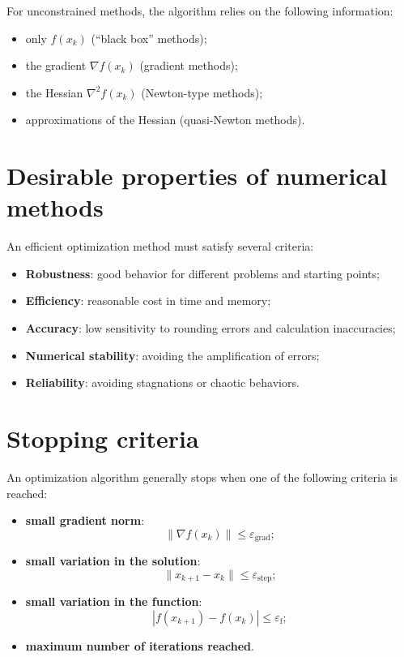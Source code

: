 For unconstrained methods, the algorithm relies on the following information:

\begin{itemize}
  \item only $f(x_k)$ (``black box'' methods);
  \item the gradient $\nabla f(x_k)$ (gradient methods);
  \item the Hessian $\nabla^2 f(x_k)$ (Newton-type methods);
  \item approximations of the Hessian (quasi-Newton methods).
\end{itemize}

\section{Desirable properties of numerical methods}

An efficient optimization method must satisfy several criteria:

\begin{itemize}
  \item \textbf{Robustness}: good behavior for different problems and starting points;
  \item \textbf{Efficiency}: reasonable cost in time and memory;
  \item \textbf{Accuracy}: low sensitivity to rounding errors and calculation inaccuracies;
  \item \textbf{Numerical stability}: avoiding the amplification of errors;
  \item \textbf{Reliability}: avoiding stagnations or chaotic behaviors.
\end{itemize}

\section{Stopping criteria}

An optimization algorithm generally stops when one of the following criteria is reached:

\begin{itemize}
  \item \textbf{small gradient norm}:
        \[
        \|\nabla f(x_k)\| \le \varepsilon_{\mathrm{grad}};
        \]
  \item \textbf{small variation in the solution}:
        \[
        \|x_{k+1}-x_k\|\le \varepsilon_{\mathrm{step}};
        \]
  \item \textbf{small variation in the function}:
        \[
        |f(x_{k+1})-f(x_k)|\le \varepsilon_{\mathrm{f}};
        \]
  \item \textbf{maximum number of iterations reached}.
\end{itemize}


